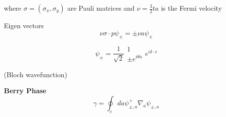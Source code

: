 \documentclass[english, 11pt]{article}
\begin{document}
			where $\sigma = (\sigma_x, \sigma_y)$ are Pauli matrices and $\nu = \frac{3}{2}ta$ is the Fermi velocity
			
			
			
			Eigen vectors
			\begin{equation}
				\nu \sigma\cdot p \psi_\pm = \pm \nu a \psi_\pm
			\end{equation}
			
			\begin{equation}
				\psi_\pm = \frac{1}{\sqrt{2}} \begin{matrix} 1 \\ \pm e^{i \theta a} \end{matrix} e^{i \delta\cdot r}
			\end{equation}
			
			(Bloch wavefunction)
			
			\textbf{Berry Phase}
			\begin{equation}
				\gamma = \oint_c da \psi_{\pm,a}^+ \nabla_a \psi_{\pm, a}
			\end{equation}
			
			
			
\end{document}
